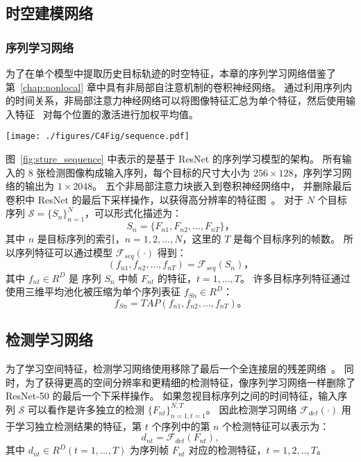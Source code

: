 \subsection{时空建模网络}

\subsubsection{序列学习网络}

为了在单个模型中提取历史目标轨迹的时空特征，本章的序列学习网络借鉴了第~\ref{chap:nonlocal} 章中具有非局部自注意机制的卷积神经网络。
通过利用序列内的时间关系，非局部注意力神经网络可以将图像特征汇总为单个特征，然后使用输入特征~\cite{RN580} 对每个位置的激活进行加权平均值。
\vspace{0.5em}
\begin{figure*}[ht]
	\centering
	\texttt{[image: ./figures/C4Fig/sequence.pdf]}
	\vspace{0.2em}
	\caption{序列学习网络的架构}
	\label{fig:sture_sequence}
\end{figure*}
 
图~\ref{fig:sture_sequence} 中表示的是基于 ResNet 的序列学习模型的架构。
所有输入的 8 张检测图像构成输入序列，每个目标的尺寸大小为 $256\times 128$，序列学习网络的输出为 $1\times2048$。
五个非局部注意力块嵌入到卷积神经网络中，
并删除最后卷积中 ResNet 的最后下采样操作，以获得高分辨率的特征图~\cite{RN985}。
对于 $N$ 个目标序列 $\mathcal{S}=\{S_n\}^N_{n=1}$，可以形式化描述为：
\begin{equation}\label{eq:pedestrian_sequence}
S_n=\{F_{n1},F_{n2},...,F_{nT}\}\mbox{，}
\end{equation}
其中 $n$ 是目标序列的索引，$n=1,2,...,N$，这里的 $T$ 是每个目标序列的帧数。
所以序列特征可以通过模型 $\mathcal{F}_{seq}(\cdot)$ 得到：
\begin{equation}\label{eq:sequence_network}
\left( f_{n1},f_{n2},...,f_{nT} \right)=\mathcal{F}_{seq}(S_n)\mbox{，}
\end{equation}
其中 $f_{nt} \in R^{D}$ 是 序列 $S_{n}$ 中帧 $F_{nt}$ 的特征，$t=1,...,T$。
许多目标序列特征通过使用三维平均池化被压缩为单个序列表征 $f_{Sn}\in R^{D}$：
\begin{equation}\label{eq:tap}
f_{Sn}=TAP\left( f_{n1},f_{n2},...,f_{nT} \right)\mbox{。}
\end{equation}
		
\subsection{检测学习网络}
为了学习空间特征，检测学习网络使用移除了最后一个全连接层的残差网络~\cite{he2016deep}。
同时，为了获得更高的空间分辨率和更精细的检测特征，像序列学习网络一样删除了 ResNet-50 的最后一个下采样操作。
如果忽视目标序列之间的时间特征，输入序列 $\mathcal{S}$ 可以看作是许多独立的检测 $\{F_{nt}\}_{n=1,t=1}^{N, T}$。
因此检测学习网络 $\mathcal{F}_{det}(\cdot)$ 用于学习独立检测结果的特征，第 $t$ 个序列中的第 $n$ 个检测特征可以表示为：
\begin{equation}\label{eq:detection_network}
d_{nt}=\mathcal{F}_{det}(F_{nt}),
\end{equation}
其中 $d_{nt}\in R^{D}(t=1,...,T)$ 为序列帧 $F_{nt}$ 对应的检测特征，$t=1,2,..,T$。

